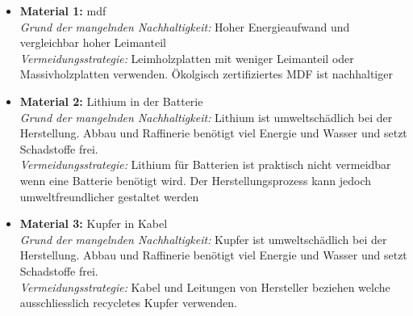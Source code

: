 \begin{itemize}
    \item \textbf{Material 1:} \acrfull{mdf} \\
          \textit{Grund der mangelnden Nachhaltigkeit:} Hoher Energieaufwand und vergleichbar hoher Leimanteil  \\
          \textit{Vermeidungsstrategie:} Leimholzplatten mit weniger Leimanteil oder Massivholzplatten verwenden. Ökolgisch zertifiziertes MDF ist nachhaltiger
          
    \item \textbf{Material 2:} Lithium in der Batterie \\
          \textit{Grund der mangelnden Nachhaltigkeit:} Lithium ist umweltschädlich bei der Herstellung. Abbau und Raffinerie benötigt viel Energie und Wasser und setzt Schadstoffe frei. \\
          \textit{Vermeidungsstrategie:} Lithium für Batterien ist praktisch nicht vermeidbar wenn eine Batterie benötigt wird. Der Herstellungsprozess kann jedoch umweltfreundlicher gestaltet werden
          
    \item \textbf{Material 3:} Kupfer in Kabel \\
          \textit{Grund der mangelnden Nachhaltigkeit:} Kupfer ist umweltschädlich bei der Herstellung. Abbau und Raffinerie benötigt viel Energie und Wasser und setzt Schadstoffe frei. \\
          \textit{Vermeidungsstrategie:} Kabel und Leitungen von Hersteller beziehen welche ausschliesslich recycletes Kupfer verwenden.
\end{itemize}